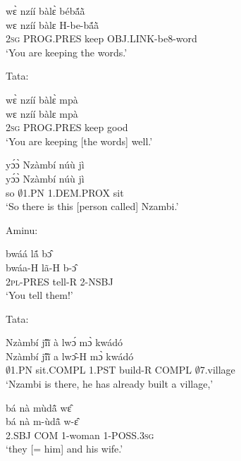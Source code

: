 \begin{exe} 
\exN\label{04} 
  \glll   wɛ̀ nzíí bàlɛ̀ bébã́ã̀ \\
      wɛ nzíí bàlɛ H-be-bã́ã̀ \\
            2\textsc{sg} PROG.PRES keep OBJ.LINK-be8-word \\
    \trans `You are keeping the words.'
\end{exe}

\noindent Tata:

\begin{exe} 
\exN\label{05} 
  \glll  wɛ̀ nzíí bàlɛ̀ mpà \\
       wɛ nzíí bàlɛ mpà \\
           2\textsc{sg} PROG.PRES keep good\\
    \trans `You are keeping [the words] well.'
\end{exe}

\begin{exe} 
\exN\label{06}
  \glll  yɔ́ɔ̀ Nzàmbí núù jì  \\
         yɔ́ɔ̀ Nzàmbí núù jì \\
          so $\emptyset$1.PN 1.DEM.PROX sit \\
    \trans `So there is this [person called] Nzambi.'
\end{exe}

\noindent Aminu:

\begin{exe} 
\exN\label{07}
  \glll  bwáá lã́ bɔ̂  \\
         bwáa-H lã-H b-ɔ̂ \\
            2\textsc{pl}-PRES tell-R 2-NSBJ     \\
    \trans `You tell them!'
\end{exe}

\noindent Tata:

\begin{exe} 
\exN\label{08}
  \glll  Nzàmbí jĩ́ĩ̀ à lwɔ́ mɔ̀ kwádó \\
         Nzàmbí jĩ́ĩ̀ a lwɔ̂-H mɔ̀ kwádó \\
             $\emptyset$1.PN sit.COMPL 1.PST build-R COMPL $\emptyset$7.village    \\
    \trans `Nzambi is there, he has already built a village,'
\end{exe}

\begin{exe} 
\exN\label{09}
  \glll  bá nà mùdã̂ wɛ̂ \\
         bá nà m-ùdã̂ w-ɛ̂\\
           2.SBJ COM 1-woman 1-POSS.3\textsc{sg}  \\
    \trans `they [= him] and his wife.'
\end{exe}

